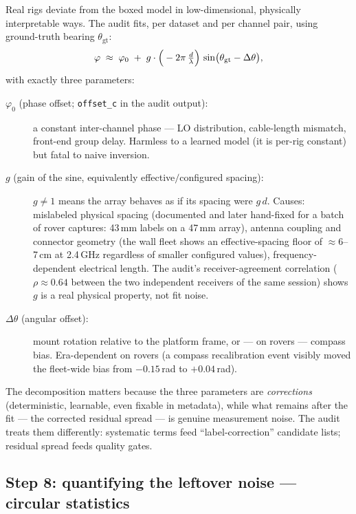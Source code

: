 Real rigs deviate from the boxed model in low-dimensional, physically
interpretable ways. The audit fits, per dataset and per channel pair, using
ground-truth bearing $\theta_{\mathrm{gt}}$:
\[
\varphi \;\approx\; \varphi_0 \;+\; g \cdot
   \Big(-2\pi\,\tfrac{d}{\lambda}\Big)\,
   \sin\!\big(\theta_{\mathrm{gt}} - \Delta\theta\big),
\]
with exactly three parameters:
\begin{description}
  \item[$\varphi_0$ (phase offset; \texttt{offset\_c} in the audit output):]
        a constant inter-channel phase --- LO distribution, cable-length
        mismatch, front-end group delay. Harmless to a learned model (it is
        per-rig constant) but fatal to naive inversion.
  \item[$g$ (gain of the sine, equivalently effective$/$configured spacing):]
        $g \ne 1$ means the array behaves as if its spacing were
        $g\,d$. Causes: mislabeled physical spacing (documented and later
        hand-fixed for a batch of rover captures: 43\,mm labels on a 47\,mm
        array), antenna coupling and connector geometry (the wall fleet shows
        an effective-spacing floor of $\approx$6--7\,cm at 2.4\,GHz
        regardless of smaller configured values), frequency-dependent
        electrical length. The audit's receiver-agreement correlation
        ($\rho \approx 0.64$ between the two independent receivers of the
        same session) shows $g$ is a real physical property, not fit noise.
  \item[$\Delta\theta$ (angular offset):] mount rotation relative to the
        platform frame, or --- on rovers --- compass bias. Era-dependent on
        rovers (a compass recalibration event visibly moved the fleet-wide
        bias from $-0.15$\,rad to $+0.04$\,rad).
\end{description}
The decomposition matters because the three parameters are \emph{corrections}
(deterministic, learnable, even fixable in metadata), while what remains
after the fit --- the corrected residual spread --- is genuine measurement
noise. The audit treats them differently: systematic terms feed
``label-correction'' candidate lists; residual spread feeds quality gates.

\subsection{Step 8: quantifying the leftover noise --- circular statistics}
\label{sec:circstats}

